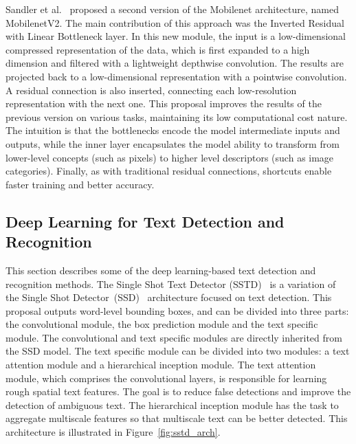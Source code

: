 Sandler et al.~\cite{Sandler2018CVPR} proposed a second version of the Mobilenet architecture, named MobilenetV2. The main contribution of this approach was the Inverted Residual with Linear Bottleneck layer. In this new module, the input is a low-dimensional compressed representation of the data, which is first expanded to a high dimension and filtered with a lightweight depthwise convolution. The results are projected back to a low-dimensional representation with a pointwise convolution. A residual connection is also inserted, connecting each low-resolution representation with the next one. This proposal improves the results of the previous version on various tasks, maintaining its low computational cost nature. The intuition is that the bottlenecks encode the model intermediate inputs and outputs, while the inner layer encapsulates the model ability to transform from lower-level concepts (such as pixels) to higher level descriptors (such as image categories). Finally, as with traditional residual connections, shortcuts enable faster training and better accuracy.

\subsection{Deep Learning for Text Detection and Recognition}
        This section describes some of the deep learning-based text detection and recognition methods.
        The Single Shot Text Detector (SSTD)~\cite{He2017ICCV} is a variation of the Single Shot Detector~(SSD)~\cite{Liu2016ECCV} architecture focused on text detection. This proposal outputs word-level bounding boxes, and can be divided into three parts: the convolutional module, the box prediction module and the text specific module. The convolutional and text specific modules are directly inherited from the SSD model. The text specific module can be divided into two modules: a text attention module and a hierarchical inception module. The text attention module, which comprises the convolutional layers, is responsible for learning rough spatial text features. The goal is to reduce false detections and improve the detection of ambiguous text. The hierarchical inception module has the task to aggregate multiscale features so that multiscale text can be better detected. This architecture is illustrated in Figure~\ref{fig:sstd_arch}. %
        
